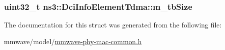 \subsubsection[{\texorpdfstring{m\+\_\+tb\+Size}{m_tbSize}}]{\setlength{\rightskip}{0pt plus 5cm}uint32\+\_\+t ns3\+::\+Dci\+Info\+Element\+Tdma\+::m\+\_\+tb\+Size}\hypertarget{structns3_1_1DciInfoElementTdma_a2cc720bbd0eae0cdd05186ef25b9a8e7}{}\label{structns3_1_1DciInfoElementTdma_a2cc720bbd0eae0cdd05186ef25b9a8e7}


The documentation for this struct was generated from the following file\+:\begin{DoxyCompactItemize}
\item 
mmwave/model/\hyperlink{mmwave-phy-mac-common_8h}{mmwave-\/phy-\/mac-\/common.\+h}\end{DoxyCompactItemize}
